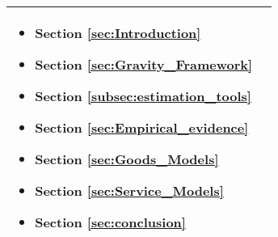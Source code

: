 \begin{table}[h]
\begin{tabular}{|p{3cm}|p{5cm}|}
\begin{itemize}
    \item Section \ref{sec:Introduction} 
    \item Section \ref{sec:Gravity_Framework}
    \item Section \ref{subsec:estimation_tools}
    \item Section \ref{sec:Empirical_evidence}
    \item Section \ref{sec:Goods_Models}
    \item Section \ref{sec:Service_Models}
    \item Section \ref{sec:conclusion}
\end{itemize} \\
\hline
\end{tabular}
\end{table}